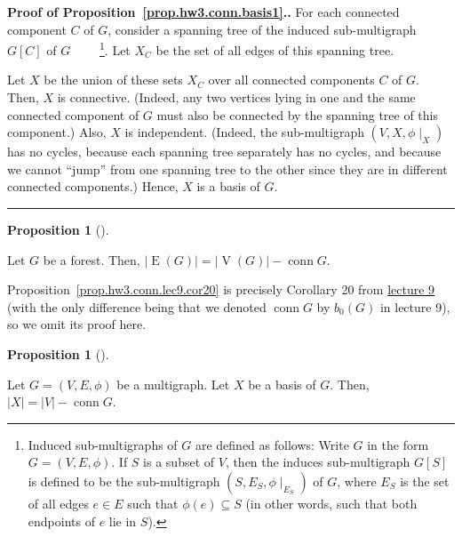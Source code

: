 \documentclass[numbers=enddot,12pt,final,onecolumn,notitlepage]{scrartcl}%
\theoremstyle{definition}
\newtheorem{prop}[theo]{Proposition}
\newenvironment{proposition}[1][]
{\begin{prop}[#1]\begin{leftbar}}
{\end{leftbar}\end{prop}}
\newenvironment{proof}[1][Proof]{\noindent\textbf{#1.} }{\ \rule{0.5em}{0.5em}}
\newcommand{\conn}{\operatorname{conn}}
\newcommand{\abs}[1]{\left| #1 \right|}
\newcommand{\tup}[1]{\left( #1 \right)}
\newcommand{\ive}[1]{\left[ #1 \right]}
\newcommand{\verts}[1]{\operatorname{V}\left( #1 \right)}
\newcommand{\edges}[1]{\operatorname{E}\left( #1 \right)}
\begin{document}
\begin{proof}[Proof of Proposition~\ref{prop.hw3.conn.basis1}.]
For each connected component $C$ of $G$, consider a spanning
tree of the induced sub-multigraph $G\ive{C}$ of $G$
\ \ \ \ \footnote{Induced sub-multigraphs of $G$ are defined as
follows:
Write $G$ in the form $G = \tup{V, E, \phi}$.
If $S$ is a subset of $V$, then the induces sub-multigraph
$G\ive{S}$ is defined to be the sub-multigraph
$\tup{S, E_S, \phi\mid_{E_S}}$ of $G$, where $E_S$ is the set
of all edges $e \in E$ such that $\phi\tup{e} \subseteq S$
(in other words, such that both endpoints of $e$ lie in $S$).}.
Let $X_C$ be the set of all edges of this spanning tree.

Let $X$ be the union of these sets $X_C$ over all connected
components $C$ of $G$.
Then, $X$ is connective.
(Indeed, any two
vertices lying in one and the same connected component of $G$
must also be connected by the spanning tree of this component.)
Also, $X$ is independent.
(Indeed, the sub-multigraph $\tup{V, X, \phi\mid_X}$ has
no cycles, because each spanning tree separately has no cycles, and
because we cannot ``jump'' from one spanning tree to the other
since they are in different connected components.)
Hence, $X$ is a basis of $G$.
\end{proof}

\begin{proposition} \label{prop.hw3.conn.lec9.cor20}
Let $G$ be a forest.
Then, $\abs{\edges{G}} = \abs{\verts{G}} - \conn G$.
\end{proposition}

Proposition~\ref{prop.hw3.conn.lec9.cor20} is precisely
Corollary 20 from
\href{http://www-users.math.umn.edu/~dgrinber/5707s17/5707lec9.pdf}{lecture 9}
(with the only difference being that we denoted $\conn G$
by $b_0 \tup{G}$ in lecture 9),
so we omit its proof here.

\begin{proposition} \label{prop.hw3.conn.basis2}
Let $G = \tup{V, E, \phi}$ be a multigraph.
Let $X$ be a basis of $G$.
Then, $\abs{X} = \abs{V} - \conn G$.
\end{proposition}
\end{document}

